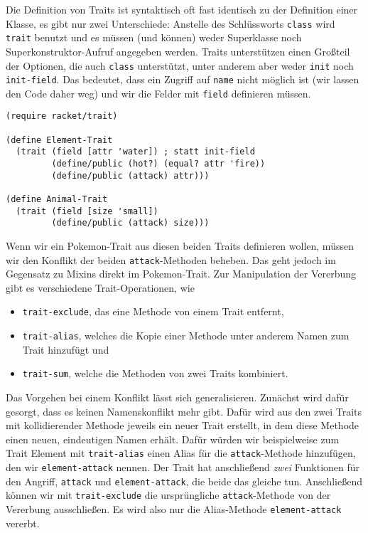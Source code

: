 Die Definition von Traits ist syntaktisch oft fast identisch zu der Definition einer Klasse, es gibt nur zwei Unterschiede: Anstelle des Schlüssworts \texttt{class} wird \texttt{trait} benutzt und es müssen (und können) weder Superklasse noch Superkonstruktor-Aufruf angegeben werden. Traits unterstützen einen Großteil der Optionen, die auch \texttt{class} unterstützt, unter anderem aber weder \texttt{init} noch \texttt{init-field}. Das bedeutet, dass ein Zugriff auf \texttt{name} nicht möglich ist (wir lassen den Code daher weg) und wir die Felder mit \texttt{field} definieren müssen.

\begin{lstlisting}
(require racket/trait)

(define Element-Trait
  (trait (field [attr 'water]) ; statt init-field
         (define/public (hot?) (equal? attr 'fire))
         (define/public (attack) attr)))

(define Animal-Trait
  (trait (field [size 'small])
         (define/public (attack) size)))
\end{lstlisting}

Wenn wir ein Pokemon-Trait aus diesen beiden Traits definieren wollen, müssen wir den Konflikt der beiden \texttt{attack}-Methoden beheben. Das geht jedoch im Gegensatz zu Mixins direkt im Pokemon-Trait. Zur Manipulation der Vererbung gibt es verschiedene Trait-Operationen, wie
\begin{itemize}
 \item \texttt{trait-exclude}, das eine Methode von einem Trait entfernt,
 \item \texttt{trait-alias}, welches die Kopie einer Methode unter anderem Namen zum Trait hinzufügt und
 \item \texttt{trait-sum}, welche die Methoden von zwei Traits kombiniert.
\end{itemize}

Das Vorgehen bei einem Konflikt lässt sich generalisieren. Zunächst wird dafür gesorgt, dass es keinen Namenskonflikt mehr gibt. Dafür wird aus den zwei Traits mit kollidierender Methode jeweils ein neuer Trait erstellt, in dem diese Methode einen neuen, eindeutigen Namen erhält. Dafür würden wir beispielweise zum Trait Element mit \texttt{trait-alias} einen Alias für die \texttt{attack}-Methode hinzufügen, den wir \texttt{element-attack} nennen. Der Trait hat anschließend \emph{zwei} Funktionen für den Angriff, \texttt{attack} und \texttt{element-attack}, die beide das gleiche tun. Anschließend können wir mit \texttt{trait-exclude} die ursprüngliche \texttt{attack}-Methode von der Vererbung ausschließen. Es wird also nur die Alias-Methode \texttt{element-attack} vererbt.

